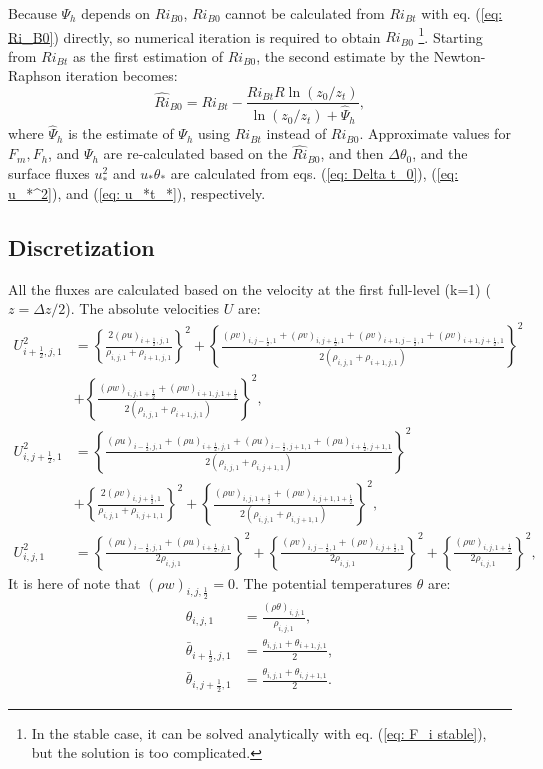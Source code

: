 Because $\Psi_h$ depends on $Ri_{B0}$,
$Ri_{B0}$ cannot be calculated from $Ri_{Bt}$ with eq. (\ref{eq: Ri_B0})
directly, so numerical iteration is required to obtain $Ri_{B0}$
\footnote{In the stable case, it can be solved analytically
with eq. (\ref{eq: F_i stable}), but the solution is too complicated.}.
Starting from $Ri_{Bt}$ as the first estimation of $Ri_{B0}$,
the second estimate by the Newton-Raphson iteration becomes:
\begin{equation}
  \hat{Ri}_{B0} = Ri_{Bt} - \frac{Ri_{Bt}R\ln(z_0/z_t)}{\ln(z_0/z_t) + \hat{\Psi}_h},
  \label{eq: Ri_B0 estimation}
\end{equation}
where $\hat{\Psi}_h$ is the estimate of $\Psi_h$ using $Ri_{Bt}$ instead of $Ri_{B0}$.
Approximate values for $F_m, F_h$, and $\Psi_h$ are re-calculated
based on the $\hat{Ri}_{B0}$, and then $\Delta\theta_0$, and the surface fluxes $u_*^2$ and $u_*\theta_*$ are calculated from eqs. (\ref{eq: Delta t_0}), (\ref{eq: u_*^2}), and (\ref{eq: u_*t_*}), respectively.




\subsection{Discretization}

\def\half{\frac{1}{2}}

All the fluxes are calculated based on the velocity at the first full-level (k=1)
($z=\Delta z/2$).
The absolute velocities $U$ are:
\begin{align}
  U_{i+\half,j,1}^2 &=
    \left\{\frac{2(\rho u)_{i+\half,j,1}}{\rho_{i,j,1}+\rho_{i+1,j,1}}\right\}^2
  + \left\{\frac{(\rho v)_{i,j-\half,1} + (\rho v)_{i,j+\half,1} + (\rho v)_{i+1,j-\half,1} + (\rho v)_{i+1,j+\half,1}}{2(\rho_{i,j,1}+\rho_{i+1,j,1})}\right\}^2 \nonumber \\
 &+ \left\{\frac{(\rho w)_{i,j,1+\half} + (\rho w)_{i+1,j,1+\half}}{2(\rho_{i,j,1}+\rho_{i+1,j,1})}\right\}^2, \\
  U_{i,j+\half,1}^2 &=
    \left\{\frac{(\rho u)_{i-\half,j,1} + (\rho u)_{i+\half,j,1} + (\rho u)_{i-\half,j+1,1} + (\rho u)_{i+\half,j+1,1}}{2(\rho_{i,j,1}+\rho_{i,j+1,1})}\right\}^2 \nonumber\\
 &+ \left\{\frac{2(\rho v)_{i,j+\half,1}}{\rho_{i,j,1}+\rho_{i,j+1,1}}\right\}^2
  + \left\{\frac{(\rho w)_{i,j,1+\half} + (\rho w)_{i,j+1,1+\half}}{2(\rho_{i,j,1}+\rho_{i,j+1,1})}\right\}^2, \\
  U_{i,j,1}^2 &=
    \left\{\frac{(\rho u)_{i-\half,j,1} + (\rho u)_{i+\half,j,1}}{2\rho_{i,j,1}}\right\}^2
  + \left\{\frac{(\rho v)_{i,j-\half,1} + (\rho v)_{i,j+\half,1}}{2\rho_{i,j,1}}\right\}^2
  + \left\{\frac{(\rho w)_{i,j,1+\half}}{2\rho_{i,j,1}}\right\}^2,
\end{align}
It is here of note that $(\rho w)_{i,j,\half}=0$.
The potential temperatures $\theta$ are:
\begin{align}
  \theta_{i,j,1} &= \frac{(\rho \theta)_{i,j,1}}{\rho_{i,j,1}}, \\
  \bar{\theta}_{i+\half,j,1} &= \frac{\theta_{i,j,1}+\theta_{i+1,j,1}}{2}, \\
  \bar{\theta}_{i,j+\half,1} &= \frac{\theta_{i,j,1}+\theta_{i,j+1,1}}{2}.
\end{align}


